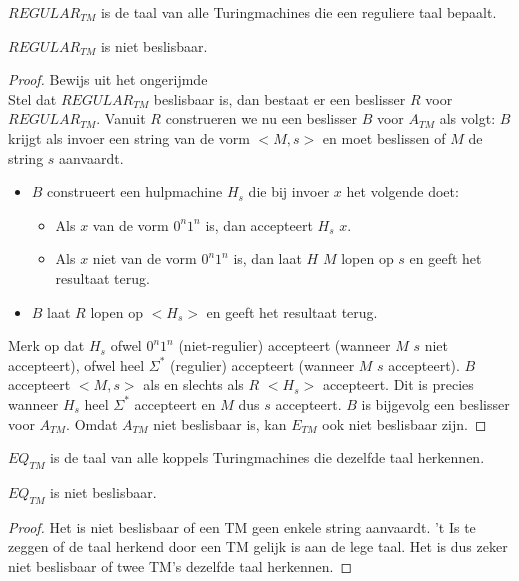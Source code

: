 \documentclass[main.tex]{subfiles}
\begin{document}
\begin{de}
  \label{de:regular-tm}
  $REGULAR_{TM}$ is de taal van alle Turingmachines die een reguliere taal bepaalt.
\end{de}

\begin{st}
  \label{st:regular-tm-niet-besl}
  $REGULAR_{TM}$ is niet beslisbaar.

  \begin{proof}
    Bewijs uit het ongerijmde\\
    Stel dat $REGULAR_{TM}$ beslisbaar is, dan bestaat er een beslisser $R$ voor $REGULAR_{TM}$.
    Vanuit $R$ construeren we nu een beslisser $B$ voor $A_{TM}$ als volgt:
    $B$ krijgt als invoer een string van de vorm $<M,s>$ en moet beslissen of $M$ de string $s$ aanvaardt.
    \begin{itemize}
    \item $B$ construeert een hulpmachine $H_{s}$ die bij invoer $x$ het volgende doet:
      \begin{itemize}
      \item Als $x$ van de vorm $0^{n}1^{n}$ is, dan accepteert $H_{s}$ $x$.
      \item Als $x$ niet van de vorm $0^{n}1^{n}$ is, dan laat $H$ $M$ lopen op $s$ en geeft het resultaat terug.
      \end{itemize}
    \item $B$ laat $R$ lopen op $<H_{s}>$ en geeft het resultaat terug.
    \end{itemize}
    Merk op dat $H_{s}$ ofwel $0^{n}1^{n}$ (niet-regulier) accepteert (wanneer $M$ $s$ niet accepteert), ofwel heel $\Sigma^{*}$ (regulier) accepteert (wanneer $M$ $s$ accepteert).
    $B$ accepteert $<M,s>$ als en slechts als $R$ $<H_{s}>$ accepteert.
    Dit is precies wanneer $H_{s}$ heel $\Sigma^{*}$ accepteert en $M$ dus $s$ accepteert.
    $B$ is bijgevolg een beslisser voor $A_{TM}$.
    Omdat $A_{TM}$ niet beslisbaar is, kan $E_{TM}$ ook niet beslisbaar zijn.
  \end{proof}
\end{st}

\begin{de}
  \label{de:eq-tm}
  $EQ_{TM}$ is de taal van alle koppels Turingmachines die dezelfde taal herkennen.
\end{de}

\begin{st}
  \label{st:eq-tm-besl}
  $EQ_{TM}$ is niet beslisbaar.

  \begin{proof}
    Het is niet beslisbaar of een TM geen enkele string aanvaardt.
    't Is te zeggen of de taal herkend door een TM gelijk is aan de lege taal.
    Het is dus zeker niet beslisbaar of twee TM's dezelfde taal herkennen.
  \end{proof}
\end{st}
\end{document}
